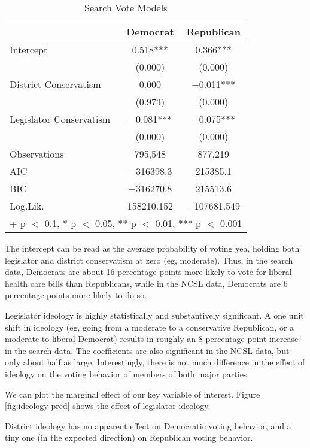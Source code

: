 \documentclass[
  oneside]{book}
\begin{document}
\begin{table}

\caption{\label{tab:votemodel-all}Search Vote Models}
\centering
\begin{tabular}[t]{lcc}
\toprule
  & Democrat & Republican\\
\midrule
Intercept & \num{0.518}*** & \num{0.366}***\\
 & (\num{0.000}) & \vphantom{1} (\num{0.000})\\
District Conservatism & \num{0.000} & \num{-0.011}***\\
 & (\num{0.973}) & (\num{0.000})\\
Legislator Conservatism & \num{-0.081}*** & \num{-0.075}***\\
 & (\num{0.000}) & (\num{0.000})\\
Observations & 795,548 & 877,219\\
\midrule
AIC & \num{-316398.3} & \num{215385.1}\\
BIC & \num{-316270.8} & \num{215513.6}\\
Log.Lik. & \num{158210.152} & \num{-107681.549}\\
\bottomrule
\multicolumn{3}{l}{\rule{0pt}{1em}+ p $<$ 0.1, * p $<$ 0.05, ** p $<$ 0.01, *** p $<$ 0.001}\\
\end{tabular}
\end{table}

The intercept can be read as the average probability of voting yea, holding both legislator and district conservatism at zero (eg, moderate). Thus, in the search data, Democrats are about 16 percentage points more likely to vote for liberal health care bills than Republicans, while in the NCSL data, Democrats are 6 percentage points more likely to do so.

Legislator ideology is highly statistically and substantively significant. A one unit shift in ideology (eg, going from a moderate to a conservative Republican, or a moderate to liberal Democrat) results in roughly an 8 percentage point increase in the search data. The coefficients are also significant in the NCSL data, but only about half as large. Interestingly, there is not much difference in the effect of ideology on the voting behavior of members of both major parties.

We can plot the marginal effect of our key variable of interest. Figure \ref{fig:ideology-pred} shows the effect of legislator ideology.

District ideology has no apparent effect on Democratic voting behavior, and a tiny one (in the expected direction) on Republican voting behavior.

  
\end{document}
